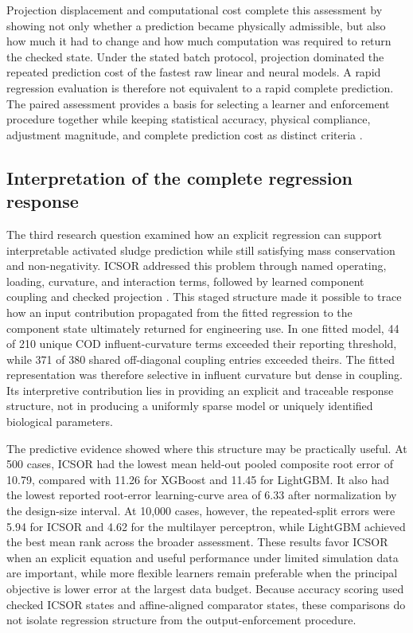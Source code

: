 Projection displacement and computational cost complete this assessment by showing not only whether a prediction became physically admissible, but also how much it had to change and how much computation was required to return the checked state. Under the stated batch protocol, projection dominated the repeated prediction cost of the fastest raw linear and neural models. A rapid regression evaluation is therefore not equivalent to a rapid complete prediction. The paired assessment provides a basis for selecting a learner and enforcement procedure together while keeping statistical accuracy, physical compliance, adjustment magnitude, and complete prediction cost as distinct criteria \citep{BhosekarIerapetritou2018}.

\subsection{Interpretation of the complete regression response}

The third research question examined how an explicit regression can support interpretable activated sludge prediction while still satisfying mass conservation and non-negativity. ICSOR addressed this problem through named operating, loading, curvature, and interaction terms, followed by learned component coupling and checked projection \citep{Selerio2026}. This staged structure made it possible to trace how an input contribution propagated from the fitted regression to the component state ultimately returned for engineering use. In one fitted model, 44 of 210 unique COD influent-curvature terms exceeded their reporting threshold, while 371 of 380 shared off-diagonal coupling entries exceeded theirs. The fitted representation was therefore selective in influent curvature but dense in coupling. Its interpretive contribution lies in providing an explicit and traceable response structure, not in producing a uniformly sparse model or uniquely identified biological parameters.

The predictive evidence showed where this structure may be practically useful. At 500 cases, ICSOR had the lowest mean held-out pooled composite root error of 10.79, compared with 11.26 for XGBoost and 11.45 for LightGBM. It also had the lowest reported root-error learning-curve area of 6.33 after normalization by the design-size interval. At 10,000 cases, however, the repeated-split errors were 5.94 for ICSOR and 4.62 for the multilayer perceptron, while LightGBM achieved the best mean rank across the broader assessment. These results favor ICSOR when an explicit equation and useful performance under limited simulation data are important, while more flexible learners remain preferable when the principal objective is lower error at the largest data budget. Because accuracy scoring used checked ICSOR states and affine-aligned comparator states, these comparisons do not isolate regression structure from the output-enforcement procedure.

